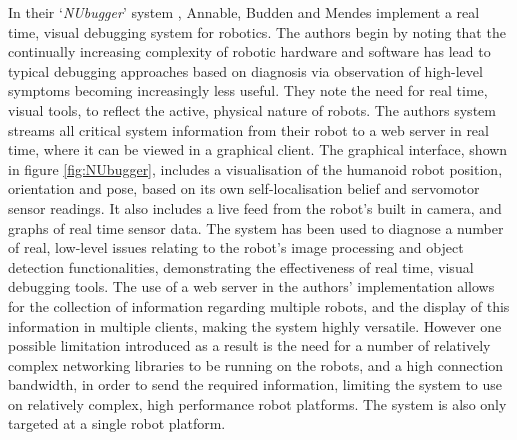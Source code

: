 In their `\textit{NUbugger}' system \cite{Annable:2014}, Annable, Budden and Mendes implement a real time, visual debugging system for robotics. The authors begin by noting that the continually increasing complexity of robotic hardware and software has lead to typical debugging approaches based on diagnosis via observation of high-level symptoms becoming increasingly less useful. They note the need for real time, visual tools, to reflect the active, physical nature of robots. The authors system \cite{Annable:2014} streams all critical system information from their robot to a web server in real time, where it can be viewed in a graphical client. The graphical interface, shown in figure \ref{fig:NUbugger}, includes a visualisation of the humanoid robot position, orientation and pose, based on its own self-localisation belief and servomotor sensor readings. It also includes a live feed from the robot's built in camera, and graphs of real time sensor data. The system has been used to diagnose a number of real, low-level issues \cite{Annable:2014} relating to the robot's image processing and object detection functionalities, demonstrating the effectiveness of real time, visual debugging tools. The use of a web server in the authors' implementation \cite{Annable:2014} allows for the collection of information regarding multiple robots, and the display of this information in multiple clients, making the system highly versatile. However one possible limitation introduced as a result is the need for a number of relatively complex networking libraries to be running on the robots, and a high connection bandwidth, in order to send the required information, limiting the system to use on relatively complex, high performance robot platforms. The system is also only targeted at a single robot platform.


